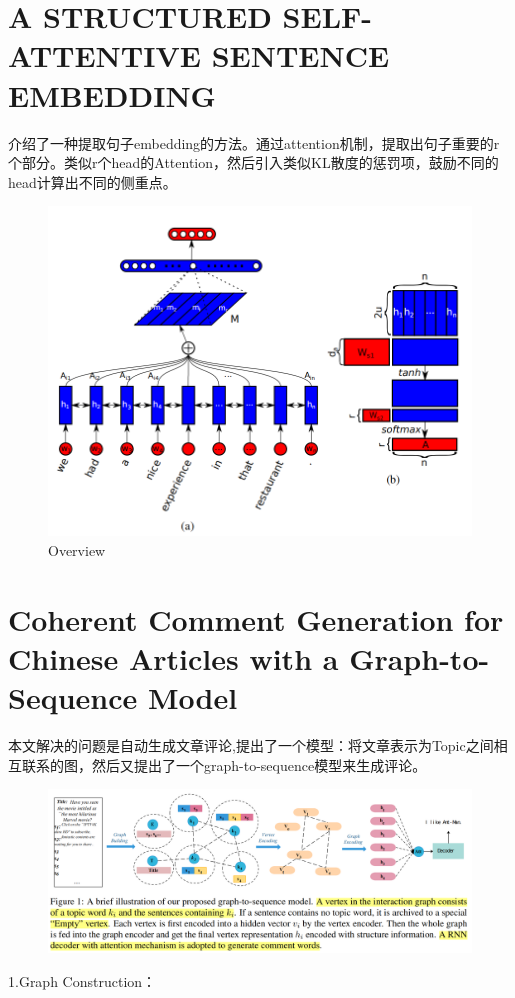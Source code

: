 \documentclass[a4paper,UTF8]{article}
\numberwithin{equation}{section}
\begin{document}
\newpage
\section{A STRUCTURED SELF-ATTENTIVE SENTENCE EMBEDDING}
介绍了一种提取句子embedding的方法。通过attention机制，提取出句子重要的r个部分。类似r个head的Attention，然后引入类似KL散度的惩罚项，鼓励不同的head计算出不同的侧重点。
\begin{figure}[H]
	\centering
	\includegraphics[width=\textwidth]{8-1.png}
	\caption{Overview}
\end{figure}

\newpage
\section{Coherent Comment Generation for Chinese Articles with a Graph-to-Sequence Model}
本文解决的问题是自动生成文章评论,提出了一个模型：将文章表示为Topic之间相互联系的图，然后又提出了一个graph-to-sequence模型来生成评论。
\begin{figure}[H]
	\centering
	\includegraphics[width=\textwidth]{9-1.png}
\end{figure}
1.Graph Construction：
\end{document}
